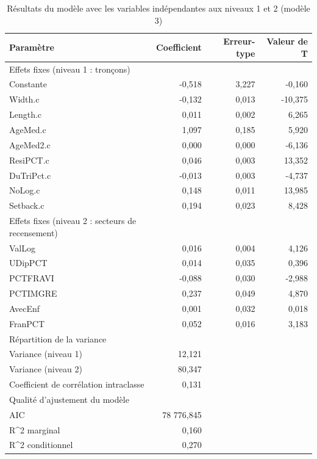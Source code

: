 \documentclass[
  11pt,
  french,
]{book}
\begin{document}
\begin{table}

\caption{\label{tab:TableauModele3}Résultats du modèle avec les variables indépendantes aux niveaux 1 et 2 (modèle 3)}
\centering
\fontsize{8}{10}\selectfont
\begin{tabular}[t]{lrrr}
\toprule
Paramètre & Coefficient & Erreur-type & Valeur de T\\
\midrule
Effets fixes (niveau 1 : tronçons) &  &  & \\
Constante & -0,518 & 3,227 & -0,160\\
Width.c & -0,132 & 0,013 & -10,375\\
Length.c & 0,011 & 0,002 & 6,265\\
AgeMed.c & 1,097 & 0,185 & 5,920\\
\addlinespace
AgeMed2.c & 0,000 & 0,000 & -6,136\\
ResiPCT.c & 0,046 & 0,003 & 13,352\\
DuTriPct.c & -0,013 & 0,003 & -4,737\\
NoLog.c & 0,148 & 0,011 & 13,985\\
Setback.c & 0,194 & 0,023 & 8,428\\
\addlinespace
Effets fixes (niveau 2 : secteurs de recensement) &  &  & \\
ValLog & 0,016 & 0,004 & 4,126\\
UDipPCT & 0,014 & 0,035 & 0,396\\
PCTFRAVI & -0,088 & 0,030 & -2,988\\
PCTIMGRE & 0,237 & 0,049 & 4,870\\
\addlinespace
AvecEnf & 0,001 & 0,032 & 0,018\\
FranPCT & 0,052 & 0,016 & 3,183\\
Répartition de la variance &  &  & \\
Variance (niveau 1) & 12,121 &  & \\
Variance (niveau 2) & 80,347 &  & \\
\addlinespace
Coefficient de corrélation intraclasse & 0,131 &  & \\
Qualité d'ajustement du modèle &  &  & \\
AIC & 78 776,845 &  & \\
R\textasciicircum{2} marginal & 0,160 &  & \\
R\textasciicircum{2} conditionnel & 0,270 &  & \\
\bottomrule
\end{tabular}
\end{table}
\end{document}
